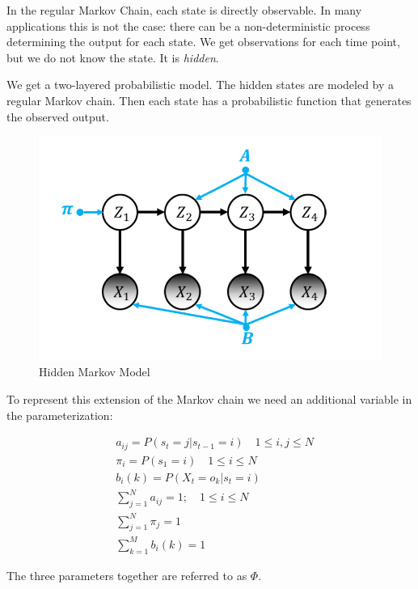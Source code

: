 In the regular Markov Chain, each state is directly observable. In many applications this is not the case: there can be a non-deterministic process determining the output for each state. We get observations for each time point, but we do not know the state. It is \emph{hidden}. 

We get a two-layered probabilistic model. The hidden states are modeled by a regular Markov chain. Then each state has a probabilistic function that generates the observed output. 

\begin{figure}
    \centering
   \includegraphics{figures/HMM.png}
\caption{Hidden Markov Model}    
\label{fig:hmm}
\end{figure}

\newpage
To represent this extension of the Markov chain we need an additional variable in the parameterization: 

\begin{equation}
\begin{aligned}
&a_{i j}=P\left(s_{t}=j | s_{t-1}=i\right) \quad 1 \leq i, j \leq N \\
&\pi_{i}=P\left(s_{1}=i\right) \quad 1 \leq i \leq N \\
&b_{i}(k)=P\left(X_{t}=o_{k} | s_{t}=i\right) \\
&\sum_{j=1}^{N} a_{i j}=1 ; \quad 1 \leq i \leq N \\
&\sum_{j=1}^{N} \pi_{j}=1 \\
&\sum_{k=1}^{M} b_{i}(k)=1
\end{aligned}
\label{eq:hmm-def}
\end{equation}

The three parameters together are referred to as $\Phi$.

